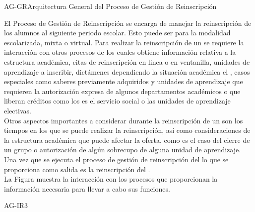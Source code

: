 \begin{Arquitectura}{AG-GR}{Arquitectura General del Proceso de Gestión de Reinscripción} {

		
		El Proceso de Gestión de Reinscripción se encarga de manejar la reinscripción de los alumnos al siguiente periodo escolar. Esto puede ser para la modalidad escolarizada, mixta o virtual. Para realizar la reinscripción de un  se requiere la interacción con otros procesos de los cuales obtiene información relativa a la estructura académica, citas de reinscripción en linea o en ventanilla, unidades de aprendizaje a inscribir, dictámenes dependiendo la situación académica el , casos especiales como saberes previamente adquiridos y unidades de aprendizaje que requieren la autorización expresa de algunos departamentos académicos o que liberan créditos como los es el servicio social o las unidades de aprendizaje electivas. \\
		
		Otros aspectos importantes a considerar durante la reinscripción de un  son los tiempos en los que se puede realizar la reinscripción, así como consideraciones de la estructura académica que puede afectar la oferta, como es el caso del cierre de un grupo o autorización de algún sobrecupo de alguna unidad de aprendizaje. Una vez que se ejecuta el proceso de gestión de reinscripción del  lo que se proporciona como salida es la reinscripción del .	\\

		\noindent La Figura  muestra la interacción con los procesos que proporcionan la información necesaria para llevar a cabo sus funciones.


		
	}{AG-IR3}

\end{Arquitectura}


